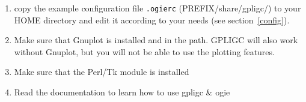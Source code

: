 \begin{enumerate}

\item copy the example configuration file
\texttt{.ogierc} (PREFIX/share/gpligc/) to your HOME directory
and edit it according to your needs (see section~\ref{config}).


\item Make sure that Gnuplot \cite{gnuplot} is installed and in the path.
GPLIGC will also work without Gnuplot,  but you will not be able to use the plotting features.

\item Make sure that the Perl/Tk \cite{perltk} module is installed

\item Read the documentation to learn how to use gpligc \& ogie

\end{enumerate}





